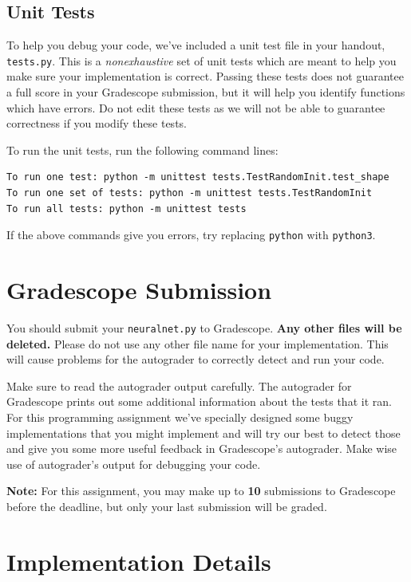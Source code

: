 \documentclass[11pt,addpoints,answers]{exam}
\begin{document}
\subsection{Unit Tests} \label{unittests}
To help you debug your code, we've included a unit test file in your handout, \texttt{tests.py}. This is a \emph{nonexhaustive} set of unit tests which are meant to help you make sure your implementation is correct. Passing these tests does not guarantee a full score in your Gradescope submission, but it will help you identify functions which have errors. Do not edit these tests as we will not be able to guarantee correctness if you modify these tests.

To run the unit tests, run the following command lines:
\begin{lstlisting}[language=Shell]
To run one test: python -m unittest tests.TestRandomInit.test_shape
To run one set of tests: python -m unittest tests.TestRandomInit
To run all tests: python -m unittest tests
\end{lstlisting}

If the above commands give you errors, try replacing \texttt{python} with \texttt{python3}.

\section{Gradescope Submission}
You should submit your \texttt{neuralnet.py} to Gradescope. \textbf{Any other files will be deleted.} Please do not use any other file name for your implementation. This will cause problems for the autograder to correctly detect and run your code.

Make sure to read the autograder output carefully. The autograder for Gradescope prints out some additional information about the tests that it ran. For this programming assignment we've specially designed some buggy implementations that you might implement and will try our best to detect those and give you some more useful feedback in Gradescope's autograder. Make wise use of autograder's output for debugging your code.

\textbf{Note:} For this assignment, you may make up to \textbf{10} submissions to Gradescope before the deadline, but only your last submission will be graded.

\newpage

\section{Implementation Details}
\end{document}
